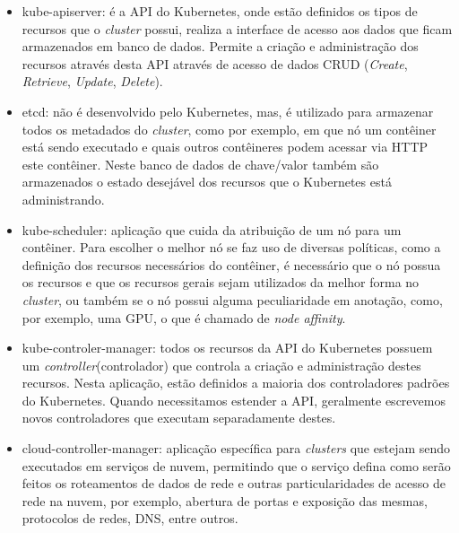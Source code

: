 \begin{itemize}
    \item kube-apiserver: é a API do Kubernetes, onde estão definidos os tipos
    de recursos que o \textit{cluster} possui, realiza a interface de acesso aos
    dados que ficam armazenados em banco de dados. Permite a criação e administração
    dos recursos através desta API através de acesso de dados CRUD (\textit{Create},
    \textit{Retrieve}, \textit{Update}, \textit{Delete}).
    \item etcd: não é desenvolvido pelo Kubernetes, mas, é utilizado para armazenar
    todos os metadados do \textit{cluster}, como por exemplo, em que nó um
    contêiner está sendo executado e quais outros contêineres podem acessar via
    HTTP este contêiner. Neste banco de dados de chave/valor também são armazenados
    o estado desejável dos recursos que o Kubernetes está administrando.
    \item kube-scheduler: aplicação que cuida da atribuição de um nó para um contêiner.
    Para escolher o melhor nó se faz uso de diversas políticas, como a definição dos
    recursos necessários do contêiner, é necessário que o nó possua os recursos e
    que os recursos gerais sejam utilizados da melhor forma no \textit{cluster},
    ou também se o nó possui alguma peculiaridade em anotação, como, por exemplo,
    uma GPU, o que é chamado de \textit{node affinity}.
    \item kube-controler-manager: todos os recursos da API do Kubernetes possuem
    um \textit{controller}(controlador) que controla a criação e administração
    destes recursos. Nesta aplicação, estão definidos a maioria dos controladores
    padrões do Kubernetes. Quando necessitamos estender a API, geralmente escrevemos
    novos controladores que executam separadamente destes.
    \item cloud-controller-manager: aplicação específica para \textit{clusters}
    que estejam sendo executados em serviços de nuvem, permitindo que o serviço defina
    como serão feitos os roteamentos de dados de rede e outras particularidades de
    acesso de rede na nuvem, por exemplo, abertura de portas e exposição das mesmas,
    protocolos de redes, DNS, entre outros.
\end{itemize}

